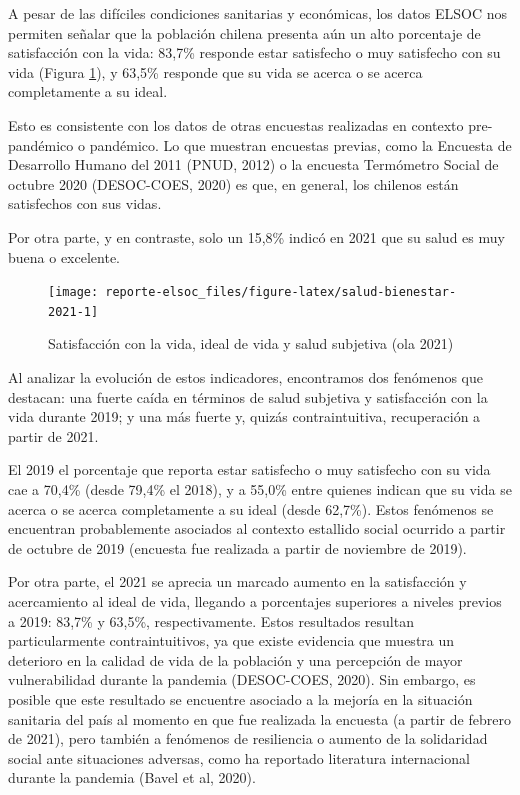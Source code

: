 \documentclass[
  12pt,
]{book}
\begin{document}
A pesar de las difíciles condiciones sanitarias y económicas, los datos ELSOC nos permiten señalar que la población chilena presenta aún un alto porcentaje de satisfacción con la vida: 83,7\% responde estar satisfecho o muy satisfecho con su vida (Figura \ref{fig:salud-bienestar-2021}), y 63,5\% responde que su vida se acerca o se acerca completamente a su ideal.

Esto es consistente con los datos de otras encuestas realizadas en contexto pre-pandémico o pandémico. Lo que muestran encuestas previas, como la Encuesta de Desarrollo Humano del 2011 (PNUD, 2012) o la encuesta Termómetro Social de octubre 2020 (DESOC-COES, 2020) es que, en general, los chilenos están satisfechos con sus vidas.

Por otra parte, y en contraste, solo un 15,8\% indicó en 2021 que su salud es muy buena o excelente.

\begin{figure}

{\centering \texttt{[image: reporte-elsoc\_files/figure-latex/salud-bienestar-2021-1]} 

}

\caption{Satisfacción con la vida, ideal de vida y salud subjetiva (ola 2021)}\label{fig:salud-bienestar-2021}
\end{figure}

Al analizar la evolución de estos indicadores, encontramos dos fenómenos que destacan: una fuerte caída en términos de salud subjetiva y satisfacción con la vida durante 2019; y una más fuerte y, quizás contraintuitiva, recuperación a partir de 2021.

El 2019 el porcentaje que reporta estar satisfecho o muy satisfecho con su vida cae a 70,4\% (desde 79,4\% el 2018), y a 55,0\% entre quienes indican que su vida se acerca o se acerca completamente a su ideal (desde 62,7\%). Estos fenómenos se encuentran probablemente asociados al contexto estallido social ocurrido a partir de octubre de 2019 (encuesta fue realizada a partir de noviembre de 2019).

Por otra parte, el 2021 se aprecia un marcado aumento en la satisfacción y acercamiento al ideal de vida, llegando a porcentajes superiores a niveles previos a 2019: 83,7\% y 63,5\%, respectivamente. Estos resultados resultan particularmente contraintuitivos, ya que existe evidencia que muestra un deterioro en la calidad de vida de la población y una percepción de mayor vulnerabilidad durante la pandemia (DESOC-COES, 2020). Sin embargo, es posible que este resultado se encuentre asociado a la mejoría en la situación sanitaria del país al momento en que fue realizada la encuesta (a partir de febrero de 2021), pero también a fenómenos de resiliencia o aumento de la solidaridad social ante situaciones adversas, como ha reportado literatura internacional durante la pandemia (Bavel et al, 2020).
\end{document}
